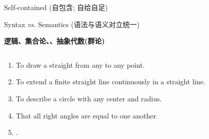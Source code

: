 
\begin{frame}{}
  \begin{center}
    Self-contained (自包含; 自给自足)


    Syntax {\it vs.} Semantics (语法与语义对立统一)
  \end{center}
\end{frame}

\begin{frame}{}
  \begin{center}
    {\bf \large {} 逻辑、集合论、、抽象代数(群论)}
  \end{center}
\end{frame}

%

\begin{frame}{}
  \begin{columns}
  \end{columns}

  \vspace{0.30cm}
  \begin{enumerate}[(1)]
    \item To draw a straight  from any  to any point.
    \item To extend a finite straight line continuously in a straight line.
    \item To describe a circle with any center and radius.
    \item That all right angles are equal to one another.
    \item {}.
  \end{enumerate}
\end{frame}

